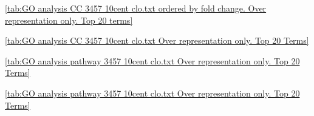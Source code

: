 \ref{tab:GO analysis CC 3457 10cent clo.txt ordered by fold change. Over representation only. Top 20 terms}

\ref{tab:GO analysis CC 3457 10cent clo.txt Over representation only. Top 20 Terms}

\ref{tab:GO analysis pathway 3457 10cent clo.txt Over representation only. Top 20 Terms}

\ref{tab:GO analysis pathway 3457 10cent clo.txt Over representation only. Top 20 Terms}



\begin{table}[ht]
\centering
\begin{adjustbox}{width=\textwidth}



\end{adjustbox}
\end{table}
